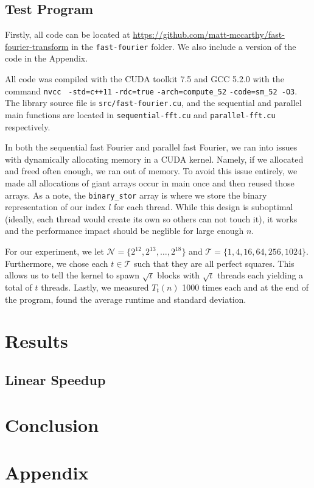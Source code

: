 \documentclass[notitlepage, twocolumn]{article}
\newcommand{\set}[1]{\lbrace #1 \rbrace}
\begin{document}
\subsection{Test Program}

Firstly, all code can be located at \url{https://github.com/matt-mccarthy/fast-fourier-transform} in the \verb|fast-fourier| folder.
We also include a version of the code in the Appendix.

All code was compiled with the CUDA toolkit 7.5 and GCC 5.2.0 with the command \verb|nvcc| \verb| -std=c++11| \verb|-rdc=true| \verb|-arch=compute_52| \verb|-code=sm_52 -O3|.
The library source file is \verb|src/fast-fourier.cu|, and the sequential and parallel main functions are located in \verb|sequential-fft.cu| and \verb|parallel-fft.cu| respectively.

In both the sequential fast Fourier and parallel fast Fourier, we ran into issues with dynamically allocating memory in a CUDA kernel.
Namely, if we allocated and freed often enough, we ran out of memory.
To avoid this issue entirely, we made all allocations of giant arrays occur in main once and then reused those arrays.
As a note, the \verb|binary_stor| array is where we store the binary representation of our index $l$ for each thread.
While this design is suboptimal (ideally, each thread would create its own so others can not touch it), it works and the performance impact should be neglible for large enough $n$.

For our experiment, we let $\mathcal{N}=\set{2^{12},2^{13},\ldots,2^{18}}$ and $\mathcal{T}=\set{1,4,16,64,256,1024}$.
Furthermore, we chose each $t\in\mathcal{T}$ such that they are all perfect squares.
This allows us to tell the kernel to spawn $\sqrt{t}$ blocks with $\sqrt{t}$ threads each yielding a total of $t$ threads.
Lastly, we measured $T_t(n)$ 1000 times each and at the end of the program, found the average runtime and standard deviation.

\section{Results}

\subsection{Linear Speedup}

\section{Conclusion}

\section*{Appendix}
\end{document}
